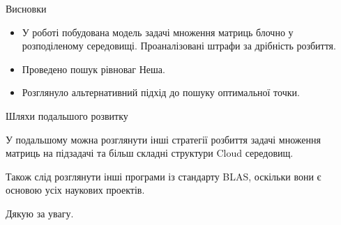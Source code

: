 \begin{frame}{Висновки}
	\manimate
	\begin{itemize}
		\item У роботі побудована модель задачі множення матриць блочно у розподіленому середовищі. Проаналізовані штрафи за дрібність розбиття.
		
		\item Проведено пошук рівноваг Неша.
		
		\item Розглянуло альтернативний підхід до пошуку оптимальної точки.
		
	\end{itemize}

\end{frame}

\begin{frame}{Шляхи подальшого розвитку}
	\manimate
	
	У подальшому можна розглянути інші стратегії розбиття задачі множення матриць на підзадачі та більш складні структури Cloud середовищ.
	
	Також слід розглянути інші програми із стандарту BLAS, оскільки вони є основою усіх наукових проектів.
\end{frame}

\begin{frame}
	\manimate
	\centering
	\Large Дякую за увагу.
\end{frame}